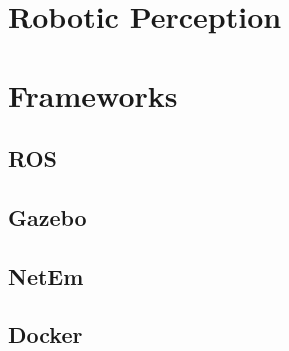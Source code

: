 \section{Robotic Perception}

\section{Frameworks}
\subsection{ROS}
\subsection{Gazebo}
\subsection{NetEm}
\subsection{Docker}
